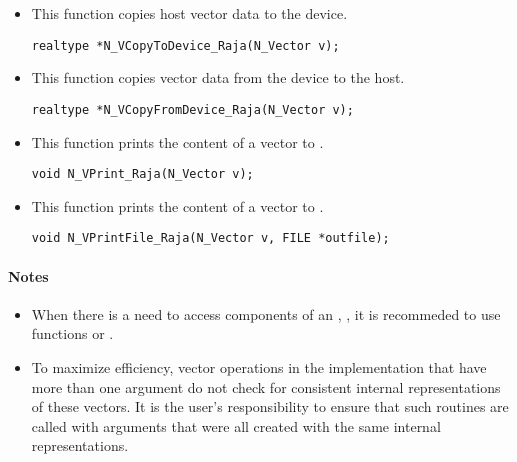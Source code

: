 \begin{itemize}
\item {}
 
 This function copies host vector data to the device.

 \verb|realtype *N_VCopyToDevice_Raja(N_Vector v);|



\item {}
 
 This function copies vector data from the device to the host.

 \verb|realtype *N_VCopyFromDevice_Raja(N_Vector v);|



\item {}
  
  This function prints the content of a {\raja} vector to .
     
  \verb|void N_VPrint_Raja(N_Vector v);|


\item {}
  
  This function prints the content of a {\raja} vector to .
     
  \verb|void N_VPrintFile_Raja(N_Vector v, FILE *outfile);|


\end{itemize}
\paragraph{\bf Notes} 
           
\begin{itemize}
                                        
\item
  When there is a need to access components of an , , 
  it is recommeded to use functions  or 
  .        
                                                               

\item
  {\warn}To maximize efficiency, vector operations in the {\nvecraja} implementation
  that have more than one  argument do not check for
  consistent internal representations of these vectors. It is the user's 
  responsibility to ensure that such routines are called with 
  arguments that were all created with the same internal representations.

\end{itemize}

